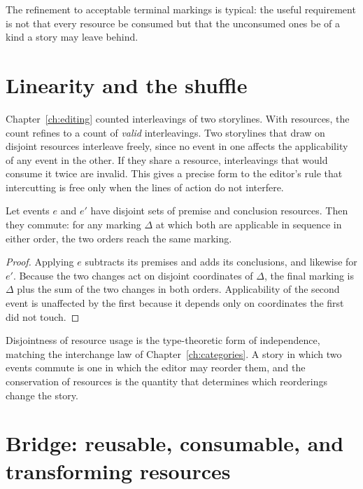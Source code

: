 The refinement to acceptable terminal markings is typical: the useful requirement is not that every resource be consumed but that the unconsumed ones be of a kind a story may leave behind.

\section{Linearity and the shuffle}

Chapter~\ref{ch:editing} counted interleavings of two storylines. With resources, the count refines to a count of \emph{valid} interleavings. Two storylines that draw on disjoint resources interleave freely, since no event in one affects the applicability of any event in the other. If they share a resource, interleavings that would consume it twice are invalid. This gives a precise form to the editor's rule that intercutting is free only when the lines of action do not interfere.

\begin{proposition}\label{prop:commute}
Let events $e$ and $e'$ have disjoint sets of premise and conclusion resources. Then they commute: for any marking $\Delta$ at which both are applicable in sequence in either order, the two orders reach the same marking.
\end{proposition}

\begin{proof}
Applying $e$ subtracts its premises and adds its conclusions, and likewise for $e'$. Because the two changes act on disjoint coordinates of $\Delta$, the final marking is $\Delta$ plus the sum of the two changes in both orders. Applicability of the second event is unaffected by the first because it depends only on coordinates the first did not touch.
\end{proof}

Disjointness of resource usage is the type-theoretic form of independence, matching the interchange law of Chapter~\ref{ch:categories}. A story in which two events commute is one in which the editor may reorder them, and the conservation of resources is the quantity that determines which reorderings change the story.

\section{Bridge: reusable, consumable, and transforming resources}

